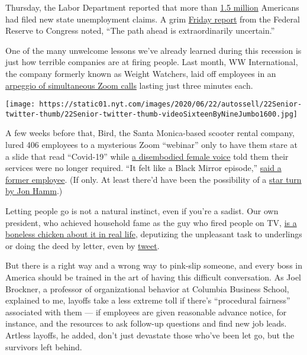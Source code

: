 Thursday, the Labor Department reported that more than
\href{https://www.nytimes.com/2020/06/11/business/economy/unemployment-claims-coronavirus.html?campaign_id=9\&emc=edit_nn_20200612\&instance_id=19339\&nl=the-morning\&regi_id=78243797\&segment_id=30751\&te=1\&user_id=271fccc23f80ce773b97febcc97e1904}{1.5
million} Americans had filed new state unemployment claims. A grim
\href{https://www.nytimes.com/2020/06/12/business/economy/federal-reserve-economy-coronavirus.html}{Friday
report} from the Federal Reserve to Congress noted, ``The path ahead is
extraordinarily uncertain.''

One of the many unwelcome lessons we've already learned during this
recession is just how terrible companies are at firing people. Last
month, WW International, the company formerly known as Weight Watchers,
laid off employees in an
\href{https://www.nytimes.com/2020/05/22/business/weight-watchers-firings-zoom.html}{arpeggio
of simultaneous Zoom calls} lasting just three minutes each.

\texttt{[image: https://static01.nyt.com/images/2020/06/22/autossell/22Senior-twitter-thumb/22Senior-twitter-thumb-videoSixteenByNineJumbo1600.jpg]}

A few weeks before that, Bird, the Santa Monica-based scooter rental
company, lured 406 employees to a mysterious Zoom ``webinar'' only to
have them stare at a slide that read ``Covid-19'' while
\href{https://dot.la/bird-layoffs-meeting-story-2645612465.html}{a
disembodied female voice} told them their services were no longer
required. ``It felt like a Black Mirror episode,''
\href{https://dot.la/bird-layoffs-meeting-story-2645612465.html}{said a
former employee}. (If only. At least there'd have been the possibility
of a
\href{https://www.nytimes.com/2014/12/22/arts/television/jon-hamm-stars-in-black-mirror-christmas-special.html}{star
turn by Jon Hamm}.)

Letting people go is not a natural instinct, even if you're a sadist.
Our own president, who achieved household fame as the guy who fired
people on TV,
\href{https://www.washingtonpost.com/outlook/2018/09/25/president-trump-is-afraid-fire-people/}{is
a boneless chicken about it in real life}, deputizing the unpleasant
task to underlings or doing the deed by letter, even by
\href{https://foreignpolicy.com/2019/09/10/bolton-trump-fires-national-security-advisor-via-twitter/}{tweet}.

But there is a right way and a wrong way to pink-slip someone, and every
boss in America should be trained in the art of having this difficult
conversation. As Joel Brockner, a professor of organizational behavior
at Columbia Business School, explained to me, layoffs take a less
extreme toll if there's ``procedural fairness'' associated with them ---
if employees are given reasonable advance notice, for instance, and the
resources to ask follow-up questions and find new job leads. Artless
layoffs, he added, don't just devastate those who've been let go, but
the survivors left behind.

